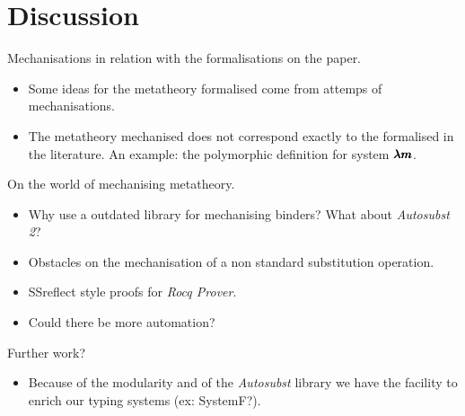 \chapter{Discussion}
\label{c:discussion}

Mechanisations in relation with the formalisations on the paper.
\begin{itemize}
\item Some ideas for the metatheory formalised come from attemps of mechanisations.
  
\item The metatheory mechanised does not correspond exactly to the formalised in the literature.
  \subitem An example: the polymorphic definition for system  $\pmb{\lambda m}$.
\end{itemize}

On the world of mechanising metatheory.
\begin{itemize}
\item Why use a outdated library for mechanising binders? What about \textit{Autosubst 2}?
\item Obstacles on the mechanisation of a non standard substitution operation.
\item SSreflect style proofs for \textit{Rocq Prover}.
\item Could there be more automation?  
\end{itemize}

Further work?
\begin{itemize}
\item Because of the modularity and of the \textit{Autosubst} library we have the facility to enrich our typing systems (ex: SystemF?).
\end{itemize}


